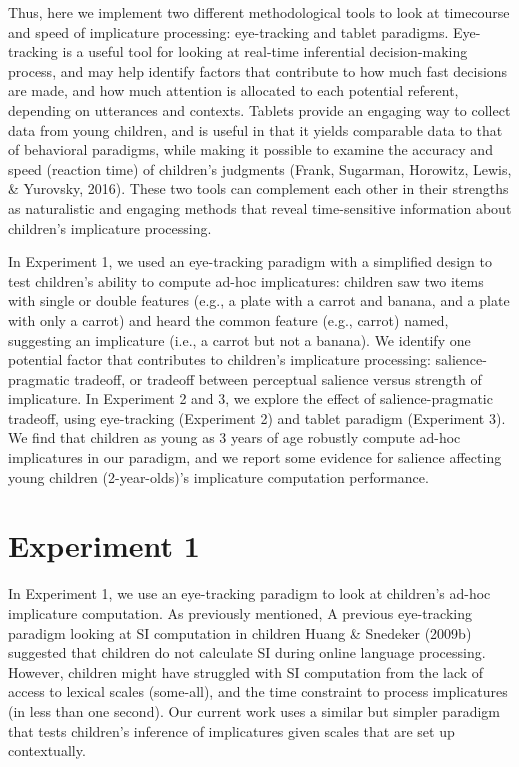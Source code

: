 \documentclass[a4paper,man,apacite,floatsintext]{apa6}
\begin{document}
Thus, here we implement two different methodological tools to look at
timecourse and speed of implicature processing: eye-tracking and tablet
paradigms. Eye-tracking is a useful tool for looking at real-time
inferential decision-making process, and may help identify factors that
contribute to how much fast decisions are made, and how much attention
is allocated to each potential referent, depending on utterances and
contexts. Tablets provide an engaging way to collect data from young
children, and is useful in that it yields comparable data to that of
behavioral paradigms, while making it possible to examine the accuracy
and speed (reaction time) of children's judgments (Frank, Sugarman,
Horowitz, Lewis, \& Yurovsky, 2016). These two tools can complement each
other in their strengths as naturalistic and engaging methods that
reveal time-sensitive information about children's implicature
processing.

In Experiment 1, we used an eye-tracking paradigm with a simplified
design to test children's ability to compute ad-hoc implicatures:
children saw two items with single or double features (e.g., a plate
with a carrot and banana, and a plate with only a carrot) and heard the
common feature (e.g., carrot) named, suggesting an implicature (i.e., a
carrot but not a banana). We identify one potential factor that
contributes to children's implicature processing: salience-pragmatic
tradeoff, or tradeoff between perceptual salience versus strength of
implicature. In Experiment 2 and 3, we explore the effect of
salience-pragmatic tradeoff, using eye-tracking (Experiment 2) and
tablet paradigm (Experiment 3). We find that children as young as 3
years of age robustly compute ad-hoc implicatures in our paradigm, and
we report some evidence for salience affecting young children
(2-year-olds)'s implicature computation performance.

\section{Experiment 1}\label{experiment-1}

In Experiment 1, we use an eye-tracking paradigm to look at children's
ad-hoc implicature computation. As previously mentioned, A previous
eye-tracking paradigm looking at SI computation in children Huang \&
Snedeker (2009b) suggested that children do not calculate SI during
online language processing. However, children might have struggled with
SI computation from the lack of access to lexical scales (some-all), and
the time constraint to process implicatures (in less than one second).
Our current work uses a similar but simpler paradigm that tests
children's inference of implicatures given scales that are set up
contextually.
\end{document}
